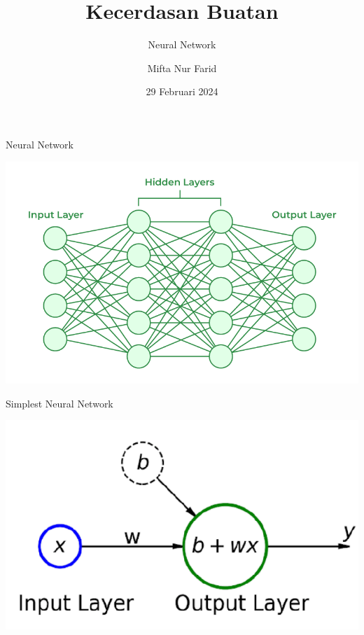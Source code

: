 \documentclass[pdflatex,compress,mathserif]{beamer}
\title{Kecerdasan Buatan}
\subtitle{Neural Network}
\author{Mifta Nur Farid}
\date{29 Februari 2024}
\begin{document}
\maketitle

\begin{frame}{Neural Network}
	\begin{center}
		\includegraphics[width=\linewidth]{img/16}
	\end{center}
\end{frame}

\begin{frame}{Simplest Neural Network}
	\begin{center}
		\includegraphics[width=0.6\linewidth]{img/15}
	\end{center}
\end{frame}
\end{document}
